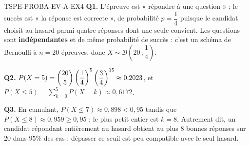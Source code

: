 \begin{corrige}{TSPE-PROBA-EV-A-EX4}
\textbf{Q1.} L'épreuve est « répondre à une question » ; le succès est « la réponse est correcte », de probabilité $p=\dfrac14$ puisque le candidat choisit au hasard parmi quatre réponses dont une seule convient. Les questions sont \textbf{indépendantes} et de même probabilité de succès : c'est un schéma de Bernoulli à $n=20$ épreuves, donc $X\sim\mathcal{B}\left(20\,;\dfrac14\right)$.

\textbf{Q2.} $P(X=5)=\dbinom{20}{5}\left(\dfrac14\right)^5\left(\dfrac34\right)^{15}\approx0{,}2023$, et
$P(X\leq5)=\displaystyle\sum_{k=0}^{5}P(X=k)\approx0{,}6172$.

\textbf{Q3.} En cumulant, $P(X\leq7)\approx0{,}898<0{,}95$ tandis que $P(X\leq8)\approx0{,}959\geq0{,}95$ : le plus petit entier est $k=8$. Autrement dit, un candidat répondant entièrement au hasard obtient au plus $8$ bonnes réponses sur $20$ dans $95\%$ des cas : dépasser ce seuil est peu compatible avec le seul hasard.
\end{corrige}
